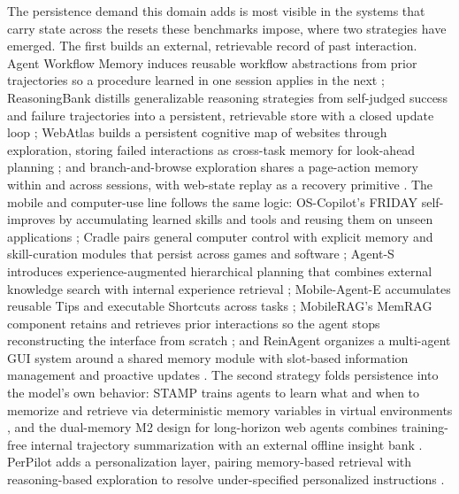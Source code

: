 The persistence demand this domain adds is most visible in the systems that carry state across the resets these benchmarks impose, where two strategies have emerged. The first builds an external, retrievable record of past interaction. Agent Workflow Memory induces reusable workflow abstractions from prior trajectories so a procedure learned in one session applies in the next \citep{wang2024agentworkflowmemory}; ReasoningBank distills generalizable reasoning strategies from self-judged success and failure trajectories into a persistent, retrievable store with a closed update loop \citep{ouyang2025reasoningbank}; WebAtlas builds a persistent cognitive map of websites through exploration, storing failed interactions as cross-task memory for look-ahead planning \citep{cheng2025webatlas}; and branch-and-browse exploration shares a page-action memory within and across sessions, with web-state replay as a recovery primitive \citep{he2025branchandbrowse}. The mobile and computer-use line follows the same logic: OS-Copilot's FRIDAY self-improves by accumulating learned skills and tools and reusing them on unseen applications \citep{wu2024oscopilot}; Cradle pairs general computer control with explicit memory and skill-curation modules that persist across games and software \citep{tan2024cradle}; Agent-S introduces experience-augmented hierarchical planning that combines external knowledge search with internal experience retrieval \citep{agashe2024agents}; Mobile-Agent-E accumulates reusable Tips and executable Shortcuts across tasks \citep{wang2025mobileagente}; MobileRAG's MemRAG component retains and retrieves prior interactions so the agent stops reconstructing the interface from scratch \citep{loo2025mobilerag}; and ReinAgent organizes a multi-agent GUI system around a shared memory module with slot-based information management and proactive updates \citep{jia2025reinagent}. The second strategy folds persistence into the model's own behavior: STAMP trains agents to learn what and when to memorize and retrieve via deterministic memory variables in virtual environments \citep{wang2026stamp}, and the dual-memory M2 design for long-horizon web agents combines training-free internal trajectory summarization with an external offline insight bank \citep{yan2026m2dualmemory}. PerPilot adds a personalization layer, pairing memory-based retrieval with reasoning-based exploration to resolve under-specified personalized instructions \citep{wang2025perpilot}.

